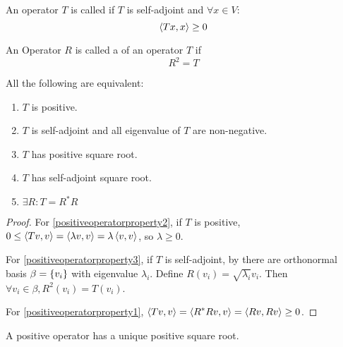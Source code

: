 \begin{definition}
    An operator $T$ is called  if $T$ is self-adjoint and $\forall x \in V$:
    \begin{equation}
        \left\langle \displaystyle Tx, x \right\rangle \geq 0
    \end{equation}
\end{definition}

\begin{definition}
    An Operator $R$ is called a  of an operator $T$ if
    \begin{equation}
        R^2 = T
    \end{equation}
\end{definition}

\begin{theorem}\label{positiveoperatorproperty}
    All the following are equivalent:
    \begin{enumerate}
        \item \label{positiveoperatorproperty1} $T$ is positive.
        \item \label{positiveoperatorproperty2} $T$ is self-adjoint and all eigenvalue of $T$ are non-negative.
        \item \label{positiveoperatorproperty3} $T$ has positive square root.
        \item \label{positiveoperatorproperty4} $T$ has self-adjoint square root.
        \item \label{positiveoperatorproperty5} $\exists R: T = R^* R$
    \end{enumerate}    
\end{theorem}
\begin{proof}
    For \ref{positiveoperatorproperty2}, if $T$ is positive, $0 \leq \left\langle \displaystyle Tv, v \right\rangle = \left\langle \displaystyle \lambda v, v \right\rangle = \lambda \left\langle \displaystyle v, v \right\rangle$, so $\lambda \geq 0$.
    
    For \ref{positiveoperatorproperty3}, if $T$ is self-adjoint, by  there are orthonormal basis $\beta=\set{v_i}$ with eigenvalue $\lambda_i$. Define $R(v_i) = \sqrt{\lambda_i} v_i$. Then $\forall v_i \in \beta,  R^2(v_i) = T(v_i)$.
    
    For \ref{positiveoperatorproperty1}, $\left\langle \displaystyle Tv, v \right\rangle = \left\langle \displaystyle R^*Rv, v \right\rangle = \left\langle \displaystyle Rv, Rv \right\rangle \geq 0$.    
\end{proof}

\begin{theorem}
    A positive operator has a unique positive square root.    
\end{theorem}

